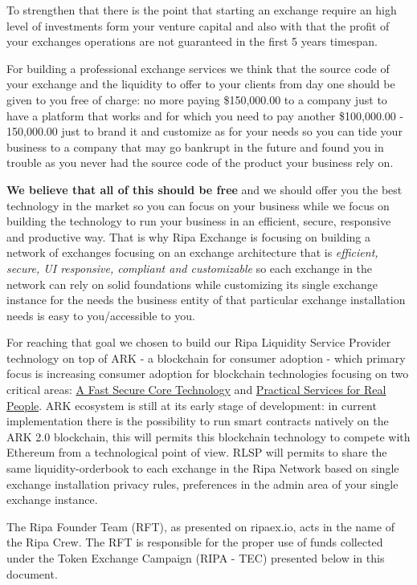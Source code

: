 \documentclass[11pt,fleqn,oneside]{book} %
\begin{document}
To strengthen that there is the point that starting an exchange require an high level of investments form your venture capital 
and also with that the profit of your exchanges operations are not guaranteed in the first 5 years timespan.

For building a professional exchange services we think that the source code of your exchange and the liquidity to offer to your clients
from day one should be given to you free of charge: no more paying \$150,000.00 to a company just to have a platform that works and for
which you need to pay another \$100,000.00 - 150,000.00 just to brand it and customize as for your needs so you can tide your 
business to a company that may go bankrupt in the future and found you in trouble as you never had the source code of the product
your business rely on.

\textbf{We believe that all of this should be free} and we should offer you the best technology in the market so you can focus on your business
while we focus on building the technology to run your business in an efficient, secure, responsive and productive way. That is why Ripa Exchange 
is focusing on building a network of exchanges focusing on an exchange architecture that is \textit{efficient, secure, UI responsive, compliant and customizable}
so each exchange in the network can rely on solid foundations while customizing its single exchange instance for the needs 
the business entity of that particular exchange installation needs is easy to you/accessible to you.

For reaching that goal we chosen to build our Ripa Liquidity Service Provider technology on top of ARK - a blockchain for consumer adoption - 
which primary focus is increasing consumer adoption for blockchain technologies focusing on two critical areas: \underline{A Fast Secure Core Technology}
and \underline{Practical Services for Real People}. ARK ecosystem is still at its early stage of development: in current implementation 
there is the possibility to run smart contracts natively on the ARK 2.0 blockchain, this will permits this blockchain technology to compete 
with Ethereum from a technological point of view. RLSP will permits to share the same liquidity-orderbook to each exchange in the Ripa Network based on
single exchange installation privacy rules, preferences in the admin area of your single exchange instance.

The Ripa Founder Team (RFT), as presented on ripaex.io, acts in the name of the Ripa Crew. The RFT is responsible for the proper use of 
funds collected under the Token Exchange Campaign (RIPA - TEC) presented below in this document.
\end{document}
